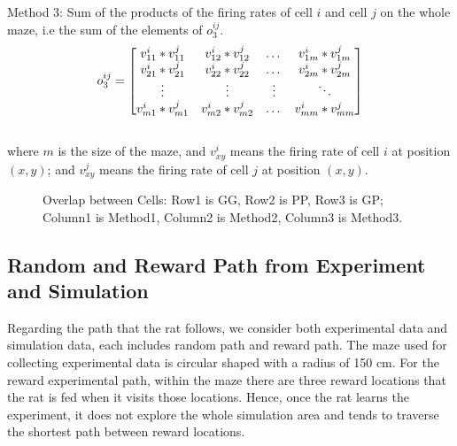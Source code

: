 \documentclass[11pt, letterpaper, onecolumn]{article}
\begin{document}
Method 3: Sum of the products of the firing rates of cell $i$ and cell $j$ on the whole maze, i.e the sum of the elements of $o_3^{ij}$.
\[
    o_3^{ij} \\
    = 
\begin{bmatrix}
    v^{i}_{11}*v^{j}_{11} & v^{i}_{12}*v^{j}_{12} & \dots  & v^{i}_{1m}*v^{j}_{1m} \\
    v^{i}_{21}*v^{j}_{21} & v^{i}_{22}*v^{j}_{22} & \dots  & v^{i}_{2m}*v^{j}_{2m} \\
    \vdots & \vdots & \vdots & \ddots \\
    v^{i}_{m1}*v^{j}_{m1} & v^{i}_{m2}*v^{j}_{m2} & \dots  & v^{i}_{mm}*v^{j}_{mm} \\
\end{bmatrix}
\] \\
where $m$ is the size of the maze, and $v^{i}_{xy}$ means the firing rate of cell $i$ at position $(x,y)$; and $v^{j}_{xy}$ means the firing rate of cell $j$ at position $(x,y)$.

\begin{figure}
\hfill
{}
\hfill
\caption{Overlap between Cells: Row1 is GG, Row2 is PP, Row3 is GP; Column1 is Method1, Column2 is Method2, Column3 is Method3.}
\end{figure}

\subsection{Random and Reward Path from Experiment and Simulation}
Regarding the path that the rat follows, we consider both experimental data and simulation data, each includes random path and reward path. The maze used for collecting experimental data is circular shaped with a radius of 150 cm. For the reward experimental path, within the maze there are three reward locations that the rat is fed when it visits those locations. Hence, once the rat learns the experiment, it does not explore the whole simulation area and tends to traverse the shortest path between reward locations.
\end{document}
